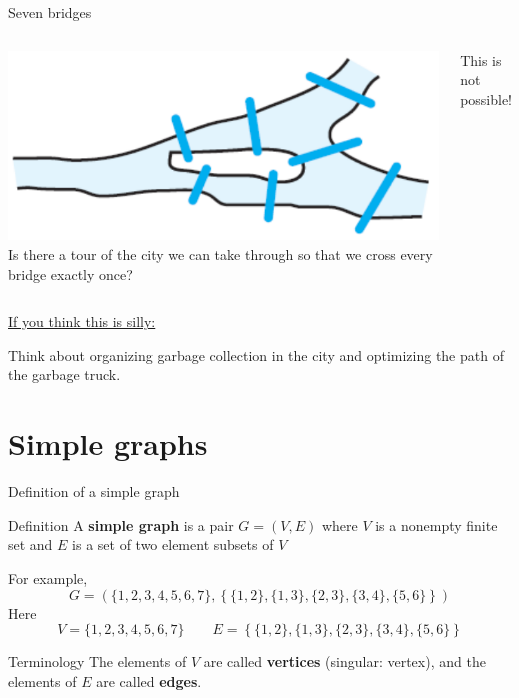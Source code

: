 \documentclass{beamer}
\def\bl[#1]#2{\begin{block}{#1}#2\end{block}}
\begin{document}
\begin{frame}{Seven bridges}
\begin{columns}
\includegraphics[scale=0.45]{7bridges.pdf}
Is there a tour of the city we can take through so that we cross every bridge exactly once?\vspace{0.5cm}

\center \color{red} This is not possible!
\end{columns}\vspace{0.3cm}
\underline{If you think this is silly:}
\vspace{0.5cm}

Think about organizing garbage collection in the city and optimizing the path of the garbage truck.
\end{frame}

\section{Simple graphs}

\begin{frame}{Definition of a simple graph}
\bl[Definition]{
A \textbf{simple graph} is a pair $G=(V,E)$ where $V$ is a nonempty finite set and $E$ is a set of two element subsets of $V$
}
For example,
\[
G=(\{1,2,3,4,5,6,7\},\left\{\{1,2\}, \{1,3\},\{2,3\},\{3,4\},\{5,6\}\right\})
\]
Here
\[
V=\{1,2,3,4,5,6,7\}\qquad E=\left\{\{1,2\}, \{1,3\},\{2,3\},\{3,4\},\{5,6\}\right\}
\]\vspace{-0.3cm}
\bl[Terminology]{
The elements of $V$ are called \textbf{vertices} (singular: vertex), and the elements of $E$ are called \textbf{edges}.
}
\end{frame}
\end{document}
